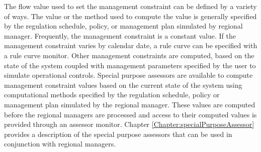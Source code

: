 The flow value used to set the management constraint can be defined by
a variety of ways.  The value or the method used to compute the value
is generally specified by the regulation schedule, policy, or
management plan simulated by regional manager.  Frequently, the
management constraint is a constant value. If the management
constraint varies by calendar date, a rule curve can be specified with
a rule curve monitor.  Other management constraints are computed,
based on the state of the system coupled with management parameters
specified by the user to simulate operational controls.  Special
purpose assessors are available to compute management constraint
values based on the current state of the system using computational
methods specified by the regulation schedule, policy or management
plan simulated by the regional manager.  These values are computed
before the regional managers are processed and access to their
computed values is provided through an assessor monitor.  Chapter
\ref{Chapter:specialPurposeAssessor} provides a description of the
special purpose assessors that can be used in conjunction with
regional managers.


